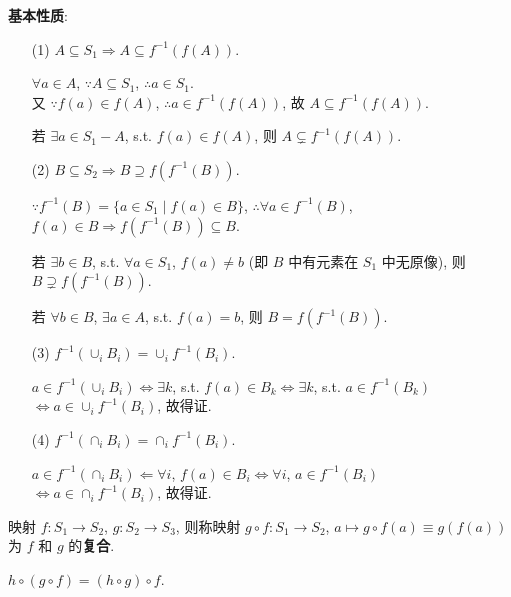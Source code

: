 \documentclass{note}
\begin{document}
\textbf{基本性质}:
\begin{itemize}
    \item[(1)] $A\subseteq S_1\Longrightarrow A\subseteq f^{-1}(f(A))$.
    \begin{pf}
        $\forall a\in A$, $\because A\subseteq S_1$, $\therefore a\in S_1$.\\
        又 $\because f(a)\in f(A)$, $\therefore a\in f^{-1}(f(A))$, 故 $A\subseteq f^{-1}(f(A))$.
    \end{pf}

    若 $\exists a\in S_1-A$, s.t. $f(a)\in f(A)$, 则 $A\subsetneq f^{-1}(f(A))$.
    \item[(2)] $B\subseteq S_2\Longrightarrow B\supseteq f(f^{-1}(B))$.
    \begin{pf}
        $\because f^{-1}(B)=\{a\in S_1\mid f(a)\in B\}$, $\therefore\forall a\in f^{-1}(B)$, $f(a)\in B\Longrightarrow f(f^{-1}(B))\subseteq B$.
    \end{pf}

    若 $\exists b\in B$, s.t. $\forall a\in S_1$, $f(a)\neq b$ (即 $B$ 中有元素在 $S_1$ 中无原像), 则 $B\supsetneq f(f^{-1}(B))$.

    若 $\forall b\in B$, $\exists a\in A$, s.t. $f(a)=b$, 则 $B=f(f^{-1}(B))$.
    \item[(3)] $f^{-1}(\cup_iB_i)=\cup_if^{-1}(B_i)$.
    \begin{pf}
        $a\in f^{-1}(\cup_iB_i)\Longleftrightarrow\exists k$, s.t. $f(a)\in B_k\Longleftrightarrow\exists k$, s.t. $a\in f^{-1}(B_k)$\\
        $\Longleftrightarrow a\in\cup_if^{-1}(B_i)$, 故得证.
    \end{pf}
    \item[(4)] $f^{-1}(\cap_iB_i)=\cap_if^{-1}(B_i)$.
    \begin{pf}
        $a\in f^{-1}(\cap_iB_i)\Longleftarrow\forall i$, $f(a)\in B_i\Longleftrightarrow\forall i$, $a\in f^{-1}(B_i)$\\
        $\Longleftrightarrow a\in\cap_if^{-1}(B_i)$, 故得证.
    \end{pf}
\end{itemize}

\begin{df}[映射的复合]
    映射 $f:S_1\rightarrow S_2$, $g:S_2\rightarrow S_3$, 则称映射 $g\circ f:S_1\rightarrow S_2$, $a\mapsto g\circ f(a)\equiv g(f(a))$ 为 $f$ 和 $g$ 的\textbf{复合}.
\end{df}

\begin{thm}[映射复合的结合律]
    $h\circ(g\circ f)=(h\circ g)\circ f$.
\end{thm}
\end{document}
